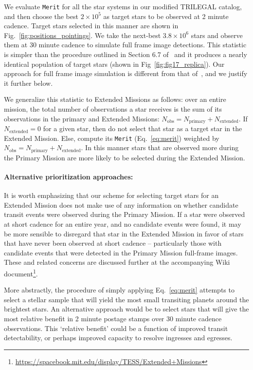 We evaluate \texttt{Merit} for all the star systems in our modified
TRILEGAL catalog, and then choose the best $2\times10^5$ as target
stars to be observed at 2 minute cadence.  Target stars selected in
this manner are shown in Fig.~\ref{fig:positions_pointings}.  We take
the next-best $3.8\times10^6$ stars and observe them at 30 minute
cadence to simulate full frame image detections.  This statistic is
simpler than the procedure outlined in Section 6.7
of~ and it produces a nearly identical
population of target stars (shown in Fig~\ref{fig:fig17_replica}).
Our approach for full frame image simulation is different from that
of~, and we justify it further below.

We generalize this statistic to Extended Missions as follows: over an
entire mission, the total number of observations a star receives is
the sum of its observations in the primary and Extended Missions:
$N_\text{obs}=N_\text{primary}+N_\text{extended}$.  If
$N_\text{extended}=0$ for a given star, then do not select that star as a
target star in the Extended Mission.  Else, compute its \texttt{Merit}
(Eq.~\ref{eq:merit}) weighted by
$N_\text{obs}=N_\text{primary}+N_\text{extended}$.  In this manner
stars that are observed more during the Primary Mission are more
likely to be selected during the Extended Mission.
 

\paragraph{Alternative prioritization approaches:}

It is worth emphasizing that our scheme for selecting target stars for
an Extended Mission does not make use of any information on whether
candidate transit events were observed during the Primary Mission.  If
a star were observed at short cadence for an entire year, and no
candidate events were found, it may be more sensible to disregard that
star in the Extended Mission in favor of stars that have never been
observed at short cadence -- particularly those with candidate events
that were detected in the Primary Mission full-frame images.  These
and related concerns are discussed further at the accompanying Wiki
document\footnote{\url{https://spacebook.mit.edu/display/TESS/Extended+Missions}}.

More abstractly, the procedure of simply applying Eq.~\ref{eq:merit}
attempts to select a stellar sample that will yield the most small
transiting planets around the brightest stars.  An alternative
approach would be to select stars that will give the most relative
benefit in 2 minute postage stamps over 30 minute cadence
observations.  This `relative benefit' could be a function of improved
transit detectability, or perhaps improved capacity to resolve
ingresses and egresses.

